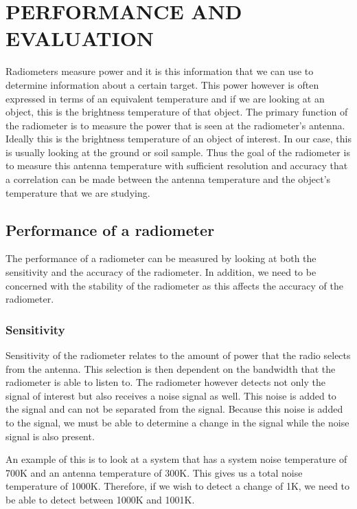 \chapter{PERFORMANCE AND EVALUATION}

Radiometers measure power and it is this information that we can use to determine information about a certain target.  This power however is often expressed in terms of an equivalent temperature and if we are looking at an object, this is the brightness temperature of that object.  The primary function of the radiometer is to measure the power that is seen at the radiometer's antenna.  Ideally this is the brightness temperature of an object of interest.  In our case, this is usually looking at the ground or soil sample.  Thus the goal of the radiometer is to measure this antenna temperature with sufficient resolution and accuracy that a correlation can be made between the antenna temperature and the object's temperature that we are studying.

\section{Performance of a radiometer}
The performance of a radiometer can be measured by looking at both the sensitivity and the accuracy of the radiometer.  In addition, we need to be concerned with the stability of the radiometer as this affects the accuracy of the radiometer.



\subsection{Sensitivity}
Sensitivity of the radiometer relates to the amount of power that the radio selects from the antenna.  This selection is then dependent on the bandwidth that the radiometer is able to listen to.  The radiometer however detects not only the signal of interest but also receives a noise signal as well.  This noise is added to the signal and can not be separated from the signal.  Because this noise is added to the signal, we must be able to determine a change in the signal while the noise signal is also present.  

An example of this is to look at a system that has a system noise temperature of 700K and an antenna temperature of 300K.  This gives us a total noise temperature of 1000K.  Therefore, if we wish to detect a change of 1K, we need to be able to detect between 1000K and 1001K.

